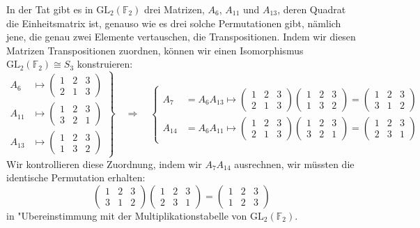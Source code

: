 \begin{beispiel}
In der Tat gibt es in $\textrm{GL}_2(\mathbb F_2)$ drei Matrizen,
$A_6$, $A_{11}$ und $A_{13}$,
deren Quadrat die Einheitsmatrix ist, genauso wie es drei solche
Permutationen gibt, nämlich jene, die genau zwei Elemente vertauschen,
die Transpositionen.
Indem wir diesen Matrizen Transpositionen zuordnen, können wir einen
Isomorphismus $\textrm{GL}_2(\mathbb F_2)\cong S_3$ konstruieren:
\[
\left.
\begin{aligned}
A_6   &\mapsto\begin{pmatrix}1&2&3\\2&1&3\end{pmatrix}
\\
A_{11}&\mapsto\begin{pmatrix}1&2&3\\3&2&1\end{pmatrix}
\\
A_{13}&\mapsto\begin{pmatrix}1&2&3\\1&3&2\end{pmatrix}
\end{aligned}
\right\}
\quad\Rightarrow\quad
\left\{
\begin{aligned}
A_7   &=A_6A_{13}\mapsto
\begin{pmatrix}1&2&3\\2&1&3\end{pmatrix}
\begin{pmatrix}1&2&3\\1&3&2\end{pmatrix}
=
\begin{pmatrix}1&2&3\\3&1&2\end{pmatrix}
\\
A_{14}&=A_6A_{11}\mapsto
\begin{pmatrix}1&2&3\\2&1&3\end{pmatrix}
\begin{pmatrix}1&2&3\\3&2&1\end{pmatrix}
=
\begin{pmatrix}1&2&3\\2&3&1\end{pmatrix}
\end{aligned}
\right.
\]
Wir kontrollieren diese Zuordnung, indem wir $A_7A_{14}$ ausrechnen,
wir müssten die identische Permutation erhalten:
\[
\begin{pmatrix}1&2&3\\3&1&2\end{pmatrix}
\begin{pmatrix}1&2&3\\2&3&1\end{pmatrix}
=
\begin{pmatrix}1&2&3\\1&2&3\end{pmatrix}
\]
in "Ubereinstimmung mit der Multiplikationstabelle von
$\textrm{GL}_2(\mathbb F_2)$.
\end{beispiel}



